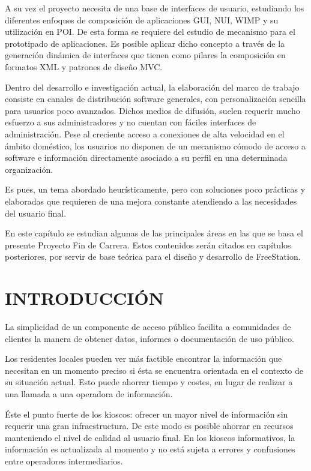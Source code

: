 A su vez el proyecto necesita de una
base de interfaces de usuario, estudiando los diferentes enfoques de composición
de aplicaciones \acs{GUI}, \acs{NUI}, \acs{WIMP} y su utilización en 
\acs{POI}. De esta forma se requiere del estudio de mecanismo para el
prototipado de aplicaciones.
Es posible aplicar dicho concepto a través de la generación dinámica de interfaces que tienen como pilares la composición en formatos \acs{XML} y
patrones de diseño \acs{MVC}. 

Dentro del desarrollo e investigación actual, la elaboración del marco de
trabajo consiste en canales de distribución software generales\cite{Lan10}, con
personalización sencilla para usuarios poco avanzados. Dichos
medios de difusión, suelen requerir mucho esfuerzo a sus administradores y no
cuentan con fáciles interfaces de administración. Pese al creciente acceso a
conexiones de alta velocidad en el ámbito doméstico, los usuarios no disponen
de un mecanismo cómodo de acceso a software e información directamente asociado
a su perfil en una determinada organización.

Es pues, un tema abordado heurísticamente, pero con soluciones poco prácticas y
elaboradas que requieren de una mejora constante
atendiendo a las necesidades del usuario final.

En este capítulo se estudian algunas de las principales áreas en las que se basa
el presente Proyecto Fin de Carrera. Estos contenidos serán citados en capítulos
posteriores, por servir de base teórica para el diseño y desarrollo de
FreeStation.

\newpage

\section{\uppercase{Introducción}}

La simplicidad de un componente de acceso público facilita a comunidades de
clientes la manera de obtener datos, informes o documentación de uso público.

Los residentes locales pueden ver más factible encontrar la información que
necesitan en un momento preciso si ésta se encuentra orientada en el 
contexto de su situación actual. Esto puede ahorrar tiempo y costes, en lugar
de realizar a una llamada a una operadora de información.

Éste el punto fuerte de los kioscos: ofrecer un mayor nivel de información sin
requerir una gran infraestructura. De este modo es posible ahorrar en recursos 
manteniendo el nivel de calidad al usuario final. 
En los kioscos informativos, la información es actualizada al momento y no está
sujeta a errores y confusiones entre operadores intermediarios.

